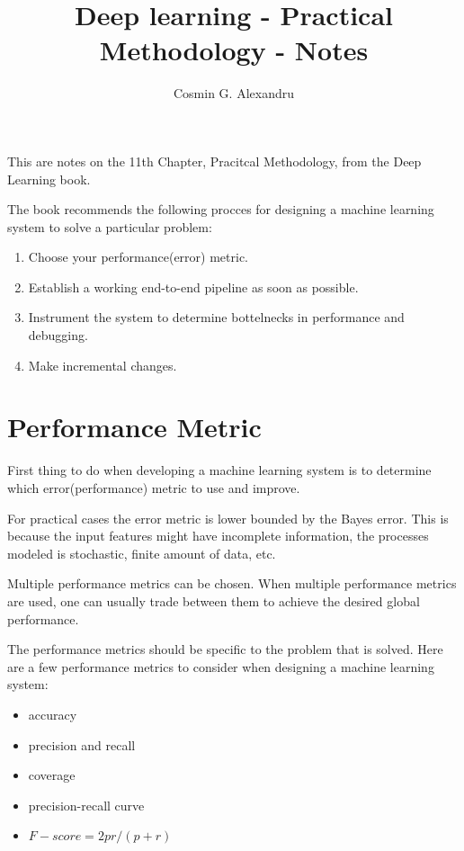 \documentclass{tufte-handout}
\title{Deep learning - Practical Methodology - Notes}
\author[Cosmin G. Alexandru]{Cosmin G. Alexandru}
\begin{document}
\maketitle%

This are notes on the 11th Chapter, Pracitcal Methodology, from the Deep Learning
book\cite{goodfellow-et-al-2016}.

The book\cite{goodfellow-et-al-2016} recommends the following procces for designing
a machine learning system to solve a particular problem:
\begin{enumerate}
    \item Choose your performance(error) metric.
    \item Establish a working end-to-end pipeline as soon as possible.
    \item Instrument the system to determine bottelnecks in performance and debugging.
    \item Make incremental changes.
\end{enumerate}

\section{Performance Metric}\label{sec:perf-metrics}
First thing to do when developing a machine learning system is to determine which
error(performance) metric to use and improve.

For practical cases the error metric is lower bounded by the Bayes error. This is
because the input features might have incomplete information, the processes modeled
is stochastic, finite amount of data, etc.

Multiple performance metrics can be chosen. When multiple performance metrics are
used, one can usually trade between them to achieve the desired global performance.

The performance metrics should be specific to the problem that is  solved. Here are
a few performance metrics to consider when designing a machine learning system:

\begin{itemize}
    \item accuracy
    \item precision and recall
    \item coverage
    \item precision-recall curve
    \item $F-score = {2pr}/({p+r})$
\end{itemize}
\end{document}
